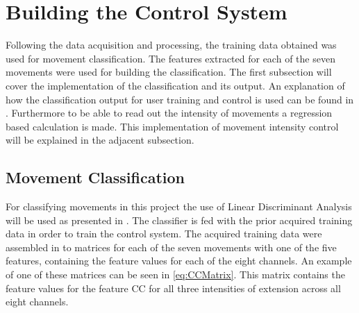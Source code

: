 \section{Building the Control System}

Following the data acquisition and processing, the training data obtained was used for movement classification. The features extracted for each of the seven movements were used for building the classification. The first subsection will cover the implementation of the classification and its output. An explanation of how the classification output for user training and control is used can be found in . Furthermore to be able to read out the intensity of movements a regression based calculation is made. This implementation of movement intensity control will be explained in the adjacent subsection.   


\subsection{Movement Classification}

For classifying movements in this project the use of Linear Discriminant Analysis will be used as presented in . The classifier is fed with the prior acquired training data in order to train the control system.  
The acquired training data were assembled in to matrices for each of the seven movements with one of the five features, containing the feature values for each of the eight channels. An example of one of these matrices can be seen in \eqref{eq:CCMatrix}. This matrix contains the feature values for the feature CC for all three intensities of extension across all eight channels.  

